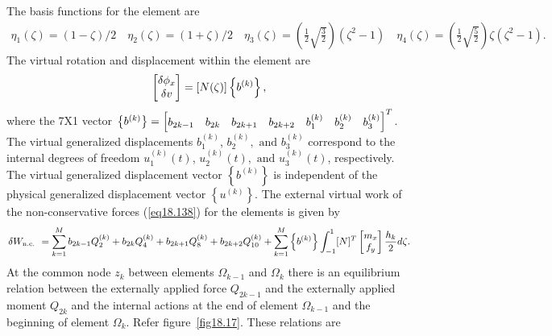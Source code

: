 \documentclass{AeroStructure-ERJohnson}
\begin{document}
The basis functions for the element are
\begin{align}\label{eq18.143}
\eta_{1}(\zeta)=(1-\zeta)/2 \quad \eta_{2}(\zeta)=(1+\zeta)/2 \quad \eta_{3}(\zeta)=\left(\frac{1}{2} \sqrt{\frac{3}{2}}\right)\left(\zeta^{2}-1\right) \quad \eta_{4}(\zeta)=\left(\frac{1}{2} \sqrt{\frac{5}{2}}\right) \zeta\left(\zeta^{2}-1\right).
\end{align}
The virtual rotation and displacement within the element are
\begin{align}\label{eq18.144}
\left[\begin{array}{@{}c@{}}\delta \phi_{x} \\\delta v\end{array}\right]=[N(\zeta)]\left\{b^{(k)}\right\},
\end{align}
where the 7X1 vector $\left\{b^{(k)}\right\}=\left[\begin{array}{@{}lllllll@{}}b_{2 k-1} & b_{2 k} & b_{2 k+1} & b_{2 k+2} & b_{1}^{(k)} & b_{2}^{(k)} & b_{3}^{(k)}\end{array}\right]^{T}$. The virtual generalized displacements $b_{1}^{(k)}$, $b_{2}^{(k)},\text{ and }b_{3}^{(k)}$ correspond to the internal degrees of freedom $u_{1}^{(k)}(t)$, $u_{2}^{(k)}(t),\text{ and }u_{3}^{(k)}(t)$, respectively. The virtual generalized displacement vector $\left\{b^{(k)}\right\}$ is independent of the physical generalized displacement vector $\left\{u^{(k)}\right\}$. The external virtual work of the non-conservative forces (\ref{eq18.138}) for the elements is given by
\begin{align}\label{eq18.145}
\delta W_{\text {n.c. }}=\sum_{k=1}^{M} b_{2 k-1} Q_{2}^{(k)}+b_{2 k} Q_{4}^{(k)}+b_{2 k+1} Q_{8}^{(k)}+b_{2 k+2} Q_{10}^{(k)}+\sum_{k=1}^{M}\left\{b^{(k)}\right\} \int_{-1}^{1}[N]^{T}\left[\begin{array}{@{}c@{}}
m_{x}\\
f_y
\end{array}\right] \frac{h_{k}}{2} d \zeta.
\end{align}
At the common node $z_k$ between elements $\Omega_{k-1}$ and $\Omega_k$ there is an equilibrium relation between the externally applied force $Q_{2 k-1}$ and the externally applied moment $Q_{2 k}$ and the internal actions at the end of element $\Omega_{k-1}$ and the beginning of element $\Omega_{k}$. Refer figure~\ref{fig18.17}. These relations are
{\def\thefigure{18.17}
}
\end{document}
